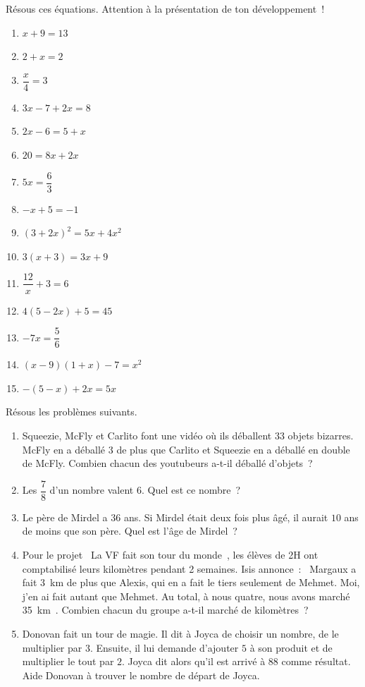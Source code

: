 \documentclass[../math2.tex]{subfiles}
\begin{document}
\newpage
\begin{exercise}
Résous ces équations. Attention à la présentation
  de ton développement~!
  \begin{enumerate}[cols=2]
    \item $x + 9 = 13$
    \item $2 + x = 2$
    \item $\dfrac{x}{4} = 3$
    \item $3x - 7 + 2x = 8$
    \item $2x - 6 = 5 + x$
    \item $20 = 8x + 2x$
    \item $5x = \dfrac{6}{3}$
    \item $- x + 5 = - 1$
    \item $(3 + 2x)^{2} = 5x + 4x^2$
    \item $3(x + 3) = 3x + 9$
    \item $\dfrac{12}{x} + 3 = 6$
    \item $4(5 - 2x)+5 = 45$
    \item $- 7x = \dfrac{5}{6}$
    \item $(x - 9)(1 + x) - 7 = x^2$
    \item $- (5 - x) + 2x = 5x$
  \end{enumerate}
\end{exercise}


\begin{exercise}
  Résous les problèmes suivants.
  \begin{enumerate}
    \item Squeezie, McFly et Carlito font une vidéo où ils déballent $33$
          objets bizarres. McFly en a déballé $3$ de plus que Carlito et
          Squeezie en a déballé en double de McFly. Combien chacun des
          youtubeurs a-t-il déballé d'objets~?

    \item Les $\dfrac{7}{8}$ d'un nombre valent $6$. Quel est ce nombre~?

    \item Le père de Mirdel a $36$ ans. Si Mirdel était deux fois plus âgé, il
          aurait $10$ ans de moins que son père. Quel est l'âge de Mirdel~?

    \item Pour le projet \og~La VF fait son tour du monde~\fg{}, les élèves de
          2\ieme H ont comptabilisé leurs kilomètres pendant 2
          semaines. Isis annonce~: \og~Margaux a fait \SI{3}{km} de plus que Alexis,
          qui en a fait le tiers seulement de Mehmet. Moi, j'en ai fait autant
          que Mehmet. Au total, à nous quatre, nous avons marché \SI{35}{km}~\fg{}.
          Combien chacun du groupe a-t-il marché de kilomètres~?

    \item Donovan fait un tour de magie. Il dit à Joyca de choisir un nombre, de
          le multiplier par $3$. Ensuite, il lui demande d'ajouter $5$ à son
          produit et de multiplier le tout par $2$. Joyca dit alors qu'il
          est arrivé à $88$ comme résultat. Aide Donovan à trouver le nombre de
          départ de Joyca.
  \end{enumerate}
\end{exercise}
\end{document}
